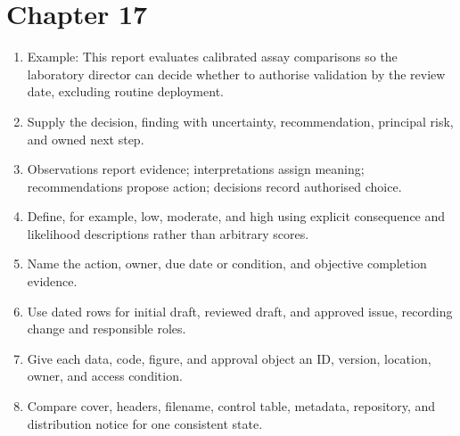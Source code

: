 \section*{Chapter 17}
\begin{enumerate}[label=17.\arabic*,leftmargin=2.4em,itemsep=0.45em]
  \item Example: This report evaluates calibrated assay comparisons so the
        laboratory director can decide whether to authorise validation by the
        review date, excluding routine deployment.
  \item Supply the decision, finding with uncertainty, recommendation, principal
        risk, and owned next step.
  \item Observations report evidence; interpretations assign meaning;
        recommendations propose action; decisions record authorised choice.
  \item Define, for example, low, moderate, and high using explicit consequence
        and likelihood descriptions rather than arbitrary scores.
  \item Name the action, owner, due date or condition, and objective completion
        evidence.
  \item Use dated rows for initial draft, reviewed draft, and approved issue,
        recording change and responsible roles.
  \item Give each data, code, figure, and approval object an ID, version,
        location, owner, and access condition.
  \item Compare cover, headers, filename, control table, metadata, repository,
        and distribution notice for one consistent state.
\end{enumerate}

